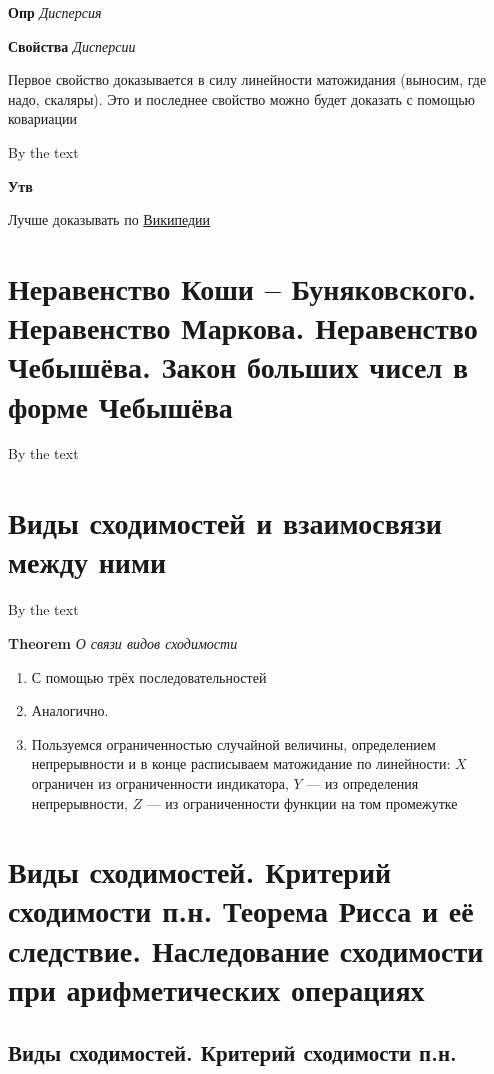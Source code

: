 \documentclass[a4paper, 14pt]{article}
\begin{document}
    \textbf{Опр} \textit{Дисперсия}
    
    \textbf{Свойства} \textit{Дисперсии}
    
    Первое свойство доказывается в силу линейности матожидания (выносим, где надо, скаляры).
    Это и последнее свойство можно будет доказать с помощью ковариации
    
    By the text
    
    \textbf{Утв}
    
    Лучше доказывать по \href{https://ru.wikipedia.org/wiki/Корреляция}{Википедии}
    
    \section{Неравенство Коши – Буняковского.
    Неравенство Маркова.
    Неравенство Чебышёва.
Закон больших чисел в форме Чебышёва}
    
    By the text
    
    \section{Виды сходимостей и взаимосвязи между ними}
    
    By the text
    
    \textbf{Theorem} \textit{О связи видов сходимости}
    
    \begin{enumerate}
        \item С помощью трёх последовательностей
        \item Аналогично.
        \item Пользуемся ограниченностью случайной величины, определением непрерывности и в конце расписываем
        матожидание по линейности: $X$ ограничен из ограниченности индикатора, $Y$ --- из определения непрерывности,
        $Z$ --- из ограниченности функции на том промежутке
    \end{enumerate}
    
    \section{Виды сходимостей. Критерий сходимости п.н.
    Теорема Рисса и её следствие.
    Наследование сходимости при арифметических операциях}
    
    \subsection{Виды сходимостей. Критерий сходимости п.н.}
    
\end{document}
